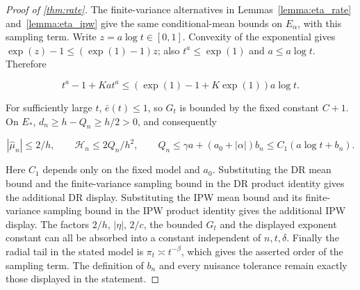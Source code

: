 \documentclass[12pt]{article}
\theoremstyle{plain}
\theoremstyle{definition}
\begin{document}
\begin{proof}[Proof of \cref{thm:rate}]
The finite-variance alternatives in Lemmas~\ref{lemma:eta_rate} and~\ref{lemma:eta_ipw} give the same conditional-mean bounds on $E_\alpha$, with this sampling term. Write $z=a\log t\in[0,1]$. Convexity of the exponential gives $\exp(z)-1\leq(\exp(1)-1)z$; also $t^a\leq\exp(1)$ and $a\leq a\log t$. Therefore

\[
t^a-1+Kat^a\leq(\exp(1)-1+K\exp(1))a\log t.
\]

For sufficiently large $t$, $\bar e(t)\leq1$, so $G_t$ is bounded by the fixed constant $C+1$. On $E_*$, $d_n\geq h-Q_n\geq h/2>0$, and consequently

\[
|\hat\mu_n|\leq2/h,\qquad \mathcal H_n\leq2Q_n/h^2,
\qquad Q_n\leq\gamma a+(a_0+|\alpha|)b_n\leq C_1(a\log t+b_n).
\]

Here $C_1$ depends only on the fixed model and $a_0$. Substituting the DR mean bound and the finite-variance sampling bound in the DR product identity gives the additional DR display. Substituting the IPW mean bound and its finite-variance sampling bound in the IPW product identity gives the additional IPW display. The factors $2/h$, $|\eta|$, $2/c$, the bounded $G_t$ and the displayed exponent constant can all be absorbed into a constant independent of $n,t,\delta$. Finally the radial tail in the stated model is $\pi_t\asymp t^{-\beta}$, which gives the asserted order of the sampling term. The definition of $b_n$ and every nuisance tolerance remain exactly those displayed in the statement.
  \end{proof}
\end{document}
